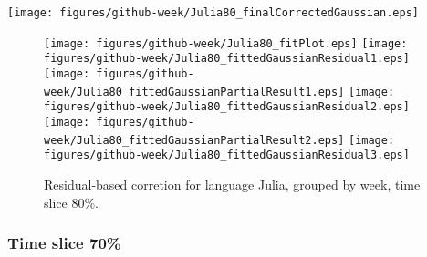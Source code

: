 \begin{center}
{\texttt{[image: figures/github-week/Julia80\_finalCorrectedGaussian.eps]}}
\end{center}

\FloatBarrier

\begin{figure}[t]
\centering
{}
{\texttt{[image: figures/github-week/Julia80\_fitPlot.eps]}}
{\texttt{[image: figures/github-week/Julia80\_fittedGaussianResidual1.eps]}}
{\texttt{[image: figures/github-week/Julia80\_fittedGaussianPartialResult1.eps]}}
{\texttt{[image: figures/github-week/Julia80\_fittedGaussianResidual2.eps]}}
{\texttt{[image: figures/github-week/Julia80\_fittedGaussianPartialResult2.eps]}}
{\texttt{[image: figures/github-week/Julia80\_fittedGaussianResidual3.eps]}}
\caption{Residual-based corretion for language Julia, grouped by week, time slice 80\%.}
\end{figure}


\FloatBarrier


\subsubsection{Time slice 70\%}

